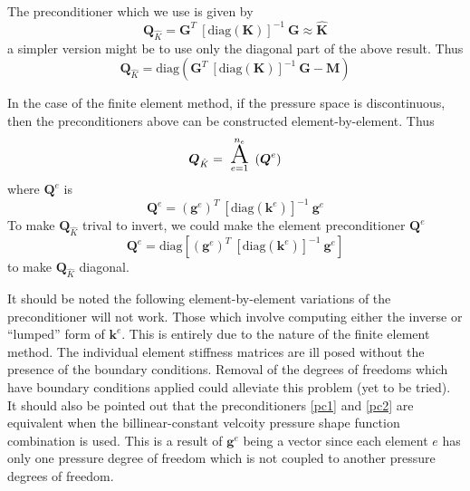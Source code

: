 \documentclass[a4paper]{article}
\newcommand{\bs}[1]{\boldsymbol{#1}}				%
\newcommand{\pc}{\mbox{${\boldsymbol Q}_{\hat K}$}}	%
\begin{document}
The preconditioner which we use is given by
\begin{equation}
	\pc
		=  {\boldsymbol G}^T \medspace \left[ \text{diag} ( {\boldsymbol K}) \right]^{-1}  \medspace  {\boldsymbol G} 
		\approx  \widehat{  {\boldsymbol  K }  }
	\label{pc1}
\end{equation}
a simpler version might be to use only the diagonal part of the above result. Thus
\begin{equation}
 \pc  =   \text{diag}\left(   
  	{\boldsymbol G}^T \medspace \left[ \text{diag} ( {\boldsymbol K}) \right]^{-1}  \medspace  {\boldsymbol G} - \bs M
	\right)
\label{pc2}
\end{equation}

In the case of the finite element method, if the pressure space is discontinuous, then the preconditioners above can
be constructed element-by-element. Thus 
\begin{equation}
	 \pc =  \mathop{      \text{ {\huge A} }       }_{e=1}^{n_e}   \left( \bs Q ^e \right)
\end{equation}
where $\bs Q^e$ is
\begin{equation}
	\bs Q^e
	= ( {\boldsymbol g^e})^T \medspace \left[ \text{diag} ( {\boldsymbol k^e}) \right]^{-1}  \medspace  {\boldsymbol g^e} 
\end{equation}
To make $\pc$ trival to invert, we could make the element preconditioner $\bs Q^e$
\begin{equation}
	\bs Q^e
	= \text{diag} \left[ ( {\boldsymbol g^e})^T \medspace \left[ \text{diag} ( {\boldsymbol k^e}) \right]^{-1}  \medspace  {\boldsymbol g^e}  \right]
\end{equation}
to make $\pc$ diagonal.

It should be noted the following element-by-element variations of the preconditioner will not work. Those which involve computing
either the inverse or ``lumped'' form of ${\boldsymbol k^e}$. This is entirely due to the nature of the finite element method. The 
individual element stiffness matrices are ill posed without the presence of the boundary conditions. Removal of the degrees of freedoms
which have boundary conditions applied could alleviate this problem (yet to be tried). It should also be pointed out that the
preconditioners \eqref{pc1} and \eqref{pc2} are equivalent when the billinear-constant velcoity pressure shape function combination is used.
This is a result of $ {\boldsymbol g^e}$ being a vector since each element $e$ has only one pressure degree of freedom which is not coupled to another pressure 
degrees of freedom.
\end{document}
